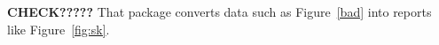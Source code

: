 \documentclass[preprint,10pt]{elsarticle}
\begin{document}
 
\textbf{CHECK?????}  That package converts data such as Figure~\ref{bad} into reports like Figure~\ref{fig:sk}. 
 



 
\end{document}

